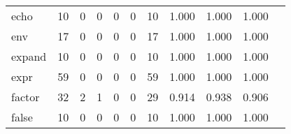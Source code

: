 \begin{longtable}{lp{1.2cm}p{1.2cm}p{1.2cm}p{1.2cm}p{1.2cm}p{1.2cm}p{1.2cm}p{1.2cm}p{1.2cm}p{1.2cm}}
echo      &                                    10 &                                                  0 &                                                  0 &                                                  0 &                                                  0 &                                                 10 &                                         1.000 &                                              1.000 &                                              1.000 \\
env       &                                    17 &                                                  0 &                                                  0 &                                                  0 &                                                  0 &                                                 17 &                                         1.000 &                                              1.000 &                                              1.000 \\
expand    &                                    10 &                                                  0 &                                                  0 &                                                  0 &                                                  0 &                                                 10 &                                         1.000 &                                              1.000 &                                              1.000 \\
expr      &                                    59 &                                                  0 &                                                  0 &                                                  0 &                                                  0 &                                                 59 &                                         1.000 &                                              1.000 &                                              1.000 \\
factor    &                                    32 &                                                  2 &                                                  1 &                                                  0 &                                                  0 &                                                 29 &                                         0.914 &                                              0.938 &                                              0.906 \\
false     &                                    10 &                                                  0 &                                                  0 &                                                  0 &                                                  0 &                                                 10 &                                         1.000 &                                              1.000 &                                              1.000 \\

\end{longtable}

